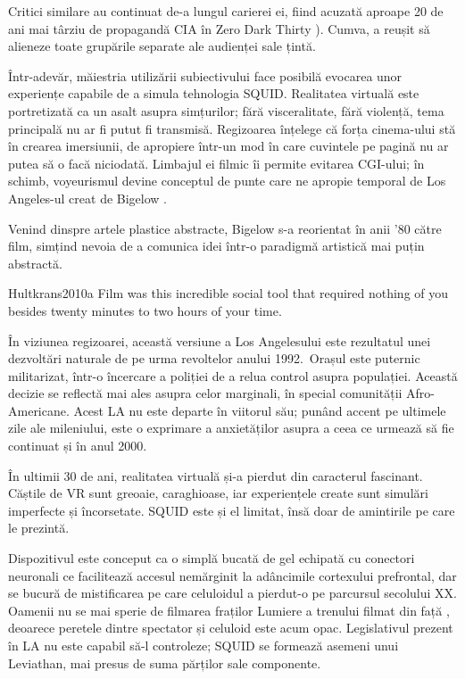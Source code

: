 \documentclass[12pt]{article}
\begin{document}
Critici similare au continuat de-a lungul carierei ei, fiind acuzată aproape 20 de ani mai târziu de propagandă CIA în Zero Dark Thirty \parencite{Vishnevetsky2012a}). Cumva, a reușit să alieneze toate grupările separate ale audienței sale țintă.\par

Într-adevăr, măiestria utilizării subiectivului face posibilă evocarea unor experiențe capabile de a simula tehnologia \dedouble SQUID\sqtworight. Realitatea virtuală este portretizată ca un asalt asupra simțurilor; fără visceralitate, fără violență, tema principală nu ar fi putut fi transmisă. Regizoarea înțelege că forța cinema-ului stă în crearea imersiunii, de apropiere într-un mod în care cuvintele pe pagină nu ar putea să o facă niciodată. Limbajul ei filmic îi permite evitarea CGI-ului; în schimb, voyeurismul devine conceptul de punte care ne apropie temporal de Los Angeles-ul creat de Bigelow \parencite{Hultkrans2010a}.\par 

Venind dinspre artele plastice abstracte, Bigelow s-a reorientat în anii '80 către film, simțind nevoia de a comunica idei într-o paradigmă artistică mai puțin abstractă.\par

\begin{displaycquote}{Hultkrans2010a}
	Film was this incredible social tool that required nothing of you besides twenty minutes to two hours of your time.
\end{displaycquote}

În viziunea regizoarei, această versiune a Los Angelesului este rezultatul unei dezvoltări naturale de pe urma revoltelor anului 1992. Orașul este puternic militarizat, într-o încercare a poliției de a relua control asupra populației. Această decizie se reflectă mai ales asupra celor marginali, în special comunității Afro-Americane. Acest LA nu este departe în viitorul său; punând accent pe ultimele zile ale mileniului, este o exprimare a anxietăților asupra a ceea ce urmează să fie continuat și în anul 2000.\par

În ultimii 30 de ani, realitatea virtuală și-a pierdut din caracterul fascinant. Căștile de VR sunt greoaie, caraghioase, iar experiențele create sunt simulări imperfecte și încorsetate. SQUID este și el limitat, însă doar de amintirile pe care le prezintă.\par

Dispozitivul este conceput ca o simplă bucată de gel echipată cu conectori neuronali ce facilitează accesul nemărginit la adâncimile cortexului prefrontal, dar se bucură de mistificarea pe care celuloidul a pierdut-o pe parcursul secolului XX. Oamenii nu se mai sperie de filmarea fraților Lumiere a trenului filmat din față \parencite{Willistein1995a}, deoarece peretele dintre spectator și celuloid este acum opac. Legislativul prezent în LA nu este capabil să-l controleze; SQUID se formează asemeni unui Leviathan, mai presus de suma părților sale componente.\par
\end{document}
